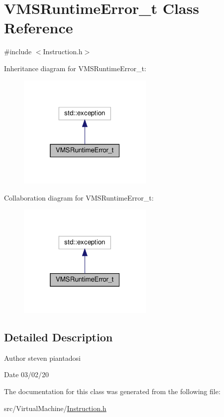 \hypertarget{class_v_m_s_runtime_error__t}{}\section{V\+M\+S\+Runtime\+Error\+\_\+t Class Reference}
\label{class_v_m_s_runtime_error__t}


{\ttfamily \#include $<$Instruction.\+h$>$}



Inheritance diagram for V\+M\+S\+Runtime\+Error\+\_\+t\+:\nopagebreak
\begin{figure}[H]
\begin{center}
\leavevmode
\includegraphics[width=184pt]{class_v_m_s_runtime_error__t__inherit__graph}
\end{center}
\end{figure}


Collaboration diagram for V\+M\+S\+Runtime\+Error\+\_\+t\+:\nopagebreak
\begin{figure}[H]
\begin{center}
\leavevmode
\includegraphics[width=184pt]{class_v_m_s_runtime_error__t__coll__graph}
\end{center}
\end{figure}


\subsection{Detailed Description}
\begin{DoxyAuthor}{Author}
steven piantadosi 
\end{DoxyAuthor}
\begin{DoxyDate}{Date}
03/02/20 
\end{DoxyDate}


The documentation for this class was generated from the following file\+:\begin{DoxyCompactItemize}
\item 
src/\+Virtual\+Machine/\hyperlink{_instruction_8h}{Instruction.\+h}\end{DoxyCompactItemize}
